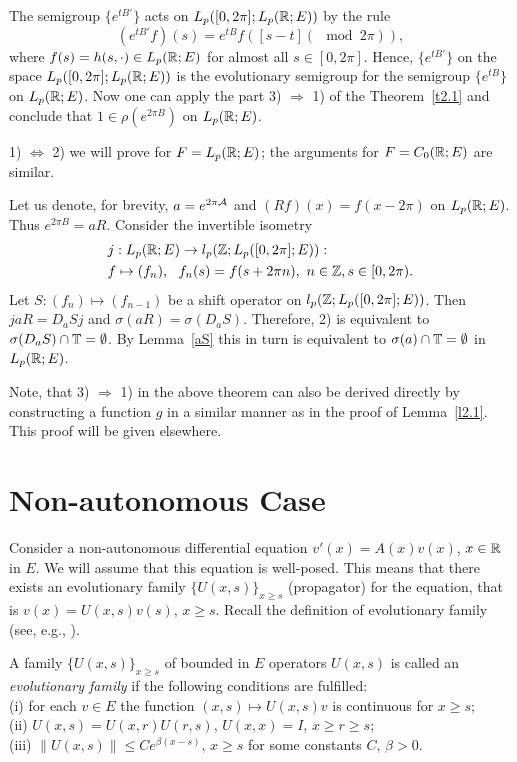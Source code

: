 \begin{pf}
The semigroup $\{e^{tB'}\}$ acts on $L_p([0, 2\pi]; L_p({\Bbb{R}}; E))$
by the rule
$$(e^{tB'}f)(s)=e^{tB}f( [s-t](\mod 2\pi)),$$
where $f(s)=h(s, \cdot)\in L_p({\Bbb{R}}; E)$ for almost all
$s\in [0,2\pi]$.
Hence, $\{e^{tB'}\}$
on the space $L_p([0,2\pi]; L_p({\Bbb{R}}; E))$
is the evolutionary semigroup for the semigroup $\{e^{tB}\}$
on $L_p({\Bbb{R}}; E)$. Now
one can apply the part 3) $\Rightarrow$ 1) of the Theorem~\ref{t2.1}
and conclude that $1\in\rho (e^{2\pi B})$ on $L_p({\Bbb{R}};E)$.

1) $\Leftrightarrow$ 2)
we will prove for $F=L_p({\Bbb{R}};E)$;
the arguments for $F=C_0({\Bbb{R}};E)$ are similar.

Let us denote, for brevity,
$a=e^{2\pi {\cal A}}$ and $(Rf)(x)=f(x-2\pi)$ on $L_p({\Bbb{R}};E)$.
Thus $e^{2\pi B}=aR$. Consider the invertible isometry
\begin{align*}
& j: L_p({\Bbb{R}};E)\to l_p({\Bbb{Z}}; L_p([0, 2\pi];E)) : \\
& f\mapsto (f_n),~~f_n(s)=f(s+2\pi n),~n\in{\Bbb{Z}}, s\in [0,2\pi).
\end{align*}
Let $S: (f_n)\mapsto (f_{n-1})$ be a shift
operator on  $l_p({\Bbb{Z}}; L_p([0, 2\pi];E))$.
Then $jaR=D_aSj$ and  $\sigma (aR) = \sigma (D_aS)$. Therefore,
2) is equivalent to $\sigma (D_aS) \cap {\Bbb{T}} =\emptyset$.
By Lemma~\ref{aS}
this in turn is equivalent to  $\sigma (a) \cap {\Bbb{T}} =\emptyset$ in
$L_p({\Bbb{R}}; E)$.
\end{pf}

Note, that 3) $\Rightarrow$ 1) in the above theorem
can also be derived directly by constructing a function $g$ in a similar
manner as in the proof of Lemma~\ref{l2.1}. This proof will be given
elsewhere.



\section{Non-autonomous Case}

Consider a non-autonomous differential equation $v'(x) =A(x) v(x)$,
$x\in{\Bbb{R}}$ in $E$.  We will assume that this equation is well-posed.
This means that there exists an evolutionary family $\{U(x,s)\}_{x\geq s}$
(propagator) for the equation, that is $v(x) =U(x,s) v(s)$, $x\geq s$.
Recall the definition of evolutionary family (see, e.g., \cite{27,31}).
\begin{defn}\label{evfam}
A family $\{U(x,s)\}_{x\geq s}$ of bounded in $E$ operators
$U(x,s)$ is called an {\it evolutionary family} if the following conditions
are
fulfilled:\\
(i)  for each $v\in E$ the
function $(x,s) \mapsto U(x,s) v$ is continuous for
$x\geq s$;\\
(ii) $U(x,s) =U(x,r) U(r,s)$, $U(x,x) =I$, $x\geq r \geq s$;\\
(iii) $\|U(x,s)\|\leq Ce^{\beta (x-s)}$, $x\geq
s$ for some constants $C$, $\beta >0$.
\end{defn}

